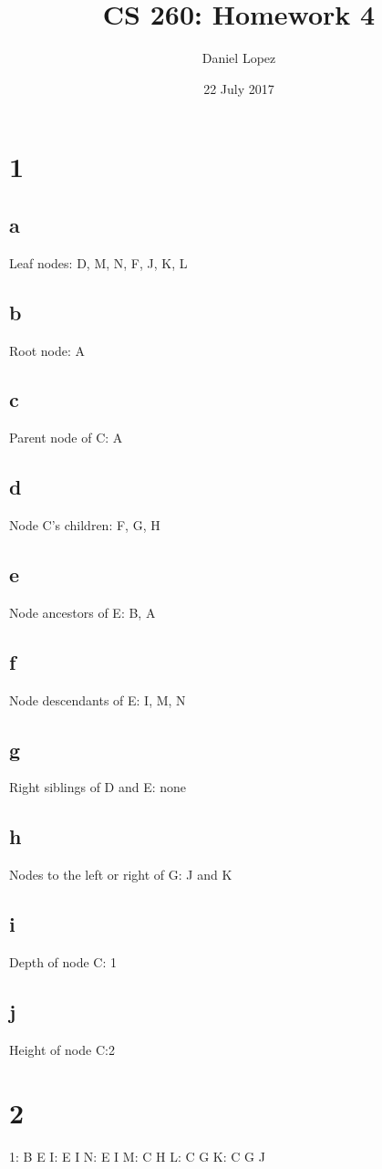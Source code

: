 \documentclass{article}
\begin{document}
\title{CS 260: Homework 4}
\author{Daniel Lopez}
\maketitle

\date{22 July 2017}

\section{1}
\subsection{a}
Leaf nodes: D, M, N, F, J, K, L
\subsection{b}
Root node: A
\subsection{c}
Parent node of C: A
\subsection{d}
Node C's children: F, G, H
\subsection{e}
Node ancestors of E: B, A
\subsection{f}
Node descendants of E: I, M, N
\subsection{g}
Right siblings of D and E: none
\subsection{h}
Nodes to the left or right of G: J and K
\subsection{i}
Depth of node C: 1
\subsection{j}
Height of node C:2
\section{2}
1: B E I: E I N: E I M: C H L: C G K: C G J\newline
\end{document}
